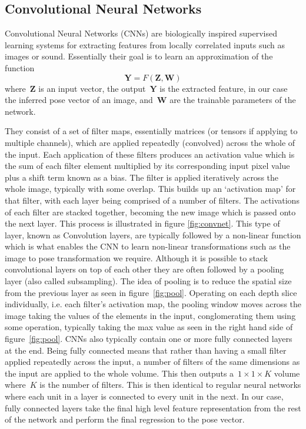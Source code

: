 \documentclass[11pt]{article} %
\begin{document}
\subsection{Convolutional Neural Networks}

Convolutional Neural Networks (CNNs) are biologically inspired supervised learning systems for extracting features from locally correlated inputs such as images or sound. Essentially their goal is to learn an approximation of the function
\begin{equation}
\boldsymbol{Y} = F(\boldsymbol{Z},\boldsymbol{W})
\label{eq:networkF}
\end{equation}
where~$\boldsymbol{Z}$ is an input vector, the output~$\boldsymbol{Y}$ is the extracted feature, in our case the inferred pose vector of an image, and~$\boldsymbol{W}$ are the trainable parameters of the network. 
 
They consist of a set of filter maps, essentially matrices (or tensors if applying to multiple channels), which are applied repeatedly (convolved) across the whole of the input. Each application of these filters produces an activation value which is the sum of each filter element multiplied by its corresponding input pixel value plus a shift term known as a bias. The filter is applied iteratively across the whole image, typically with some overlap. This builds up an `activation map' for that filter, with each layer being comprised of a number of filters. The activations of each filter are stacked together, becoming the new image which is passed onto the next layer. This process is illustrated in figure \ref{fig:convnet}. This type of layer, known as Convolution layers, are typically followed by a non-linear function which is what enables the CNN to learn non-linear transformations such as the image to pose transformation we require. Although it is possible to stack convolutional layers on top of each other they are often followed by a pooling layer (also called subsampling). The idea of pooling is to reduce the spatial size from the previous layer as seen in figure~\ref{fig:pool}. Operating on each depth slice individually, i.e. each filter's activation map, the pooling window moves across the image taking the values of the elements in the input, conglomerating them using some operation, typically taking the max value as seen in the right hand side of figure~\ref{fig:pool}. CNNs also typically contain one or more fully connected layers at the end. Being fully connected means that rather than having a small filter applied repeatedly across the input, a number of filters of the same dimensions as the input are applied to the whole volume. This then outputs a~$1\times 1 \times K$ volume where~$K$ is the number of filters. This is then identical to regular neural networks where each unit in a layer is connected to every unit in the next. In our case, fully connected layers take the final high level feature representation from the rest of the network and perform the final regression to the pose vector. 
\end{document}
